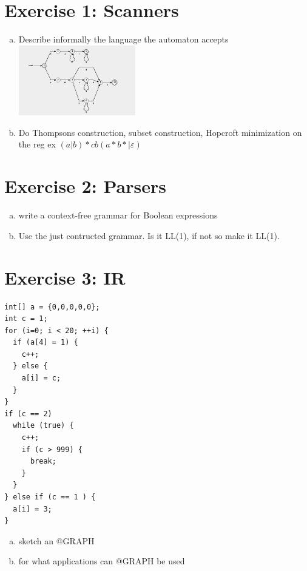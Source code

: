 \documentclass[a4paper]{article}
\begin{document}
	\section*{Exercise 1: Scanners}\label{sec:exercise1}
   \begin{enumerate}[a.]
		\item Describe informally the language the automaton accepts \\
		\includegraphics[keepaspectratio,width=0.4\textwidth]{exam_img/automaton_0}
        \item Do Thompsons construction, subset construction, Hopcroft minimization on the reg ex $(a|b)*cb(a*b*|\varepsilon)$
   \end{enumerate}

	\section*{Exercise 2: Parsers}\label{sec:exercise2}
        \begin{enumerate}[a.]
            \item write a context-free grammar for Boolean expressions
            \item Use the just contructed grammar. Is it LL(1), if not so make it LL(1). \\
           
        \end{enumerate}


	\section*{Exercise 3: IR}\label{sec:exercise3}
	\begin{lstlisting}
int[] a = {0,0,0,0,0};
int c = 1;
for (i=0; i < 20; ++i) {
  if (a[4] = 1) {
    c++;
  } else {
    a[i] = c;
  }
}
if (c == 2)
  while (true) {
    c++;
    if (c > 999) {
	  break;
	}
  }
} else if (c == 1 ) {
  a[i] = 3;
}	
	\end{lstlisting}
	\begin{enumerate}[a.]
        \item sketch an @GRAPH
        \item for what applications can @GRAPH be used
    \end{enumerate}
\newpage
\end{document}
